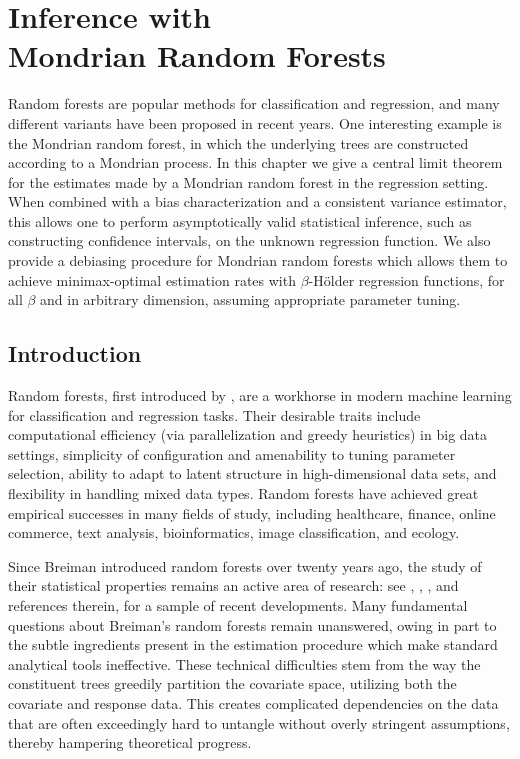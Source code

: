 
\chapter[Inference with Mondrian Random Forests]%
{Inference with \\ Mondrian Random Forests}
\label{ch:mondrian}

Random forests are popular methods for classification and regression, and many
different variants have been proposed in recent years. One interesting example
is the Mondrian random forest, in which the underlying trees are constructed
according to a Mondrian process. In this chapter we give a central limit theorem
for the estimates made by a Mondrian random forest in the regression setting.
When combined with a bias characterization and a consistent variance estimator,
this allows one to perform asymptotically valid statistical inference, such as
constructing confidence intervals, on the unknown regression function. We also
provide a debiasing procedure for Mondrian random forests which allows them to
achieve minimax-optimal estimation rates with $\beta$-H{\"o}lder regression
functions, for all $\beta$ and in arbitrary dimension, assuming appropriate
parameter tuning.

\section{Introduction}

Random forests, first introduced by \citet{breiman2001random}, are a workhorse
in modern machine learning for classification and regression tasks.
Their desirable traits include computational efficiency (via parallelization
and greedy heuristics) in big data settings, simplicity of configuration and
amenability to tuning parameter selection, ability to adapt to latent structure
in high-dimensional data sets, and flexibility in handling mixed data types.
Random forests have achieved great empirical successes in many fields of study,
including healthcare, finance, online commerce, text analysis, bioinformatics,
image classification, and ecology.

Since Breiman introduced random forests over twenty years ago, the study of
their statistical properties remains an active area of research: see
\citet{Scornet-Biau-Vert_2015_AOS}, \citet{Chi-Vossler-Fan-Lv_2022_AOS},
\citet{klusowski2021universal}, and references therein, for a sample of recent
developments. Many fundamental questions about Breiman's random forests remain
unanswered, owing in part to the subtle ingredients present in the estimation
procedure which make standard analytical tools ineffective. These technical
difficulties stem from the way the constituent trees greedily partition the
covariate space, utilizing both the covariate and response data. This creates
complicated dependencies on the data that are often exceedingly hard to
untangle without overly stringent assumptions, thereby hampering theoretical
progress.

